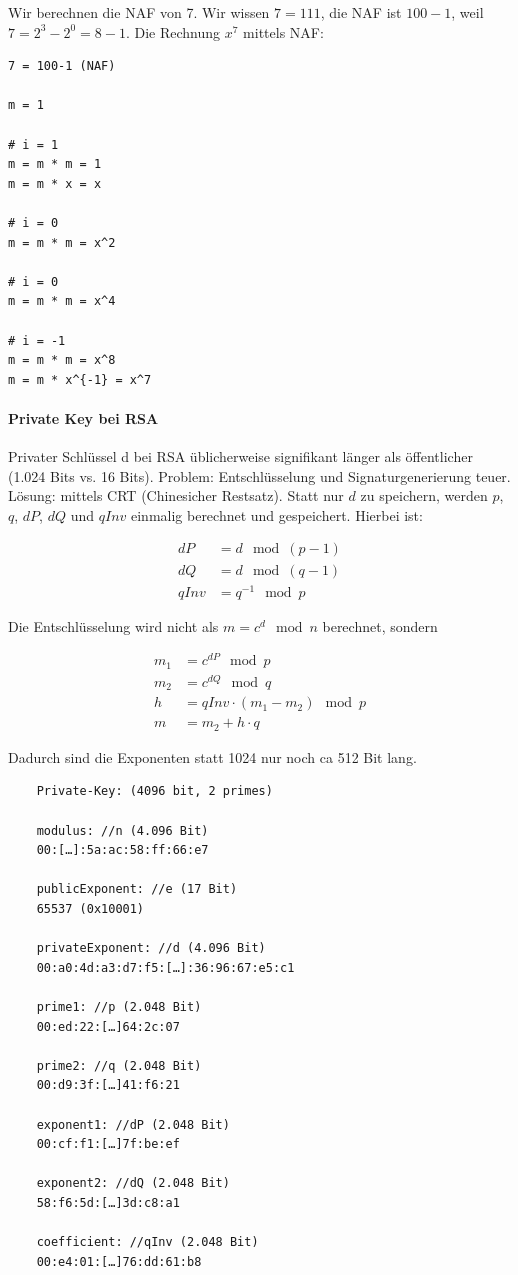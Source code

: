 Wir berechnen die NAF von 7. Wir wissen $7 = 111$, die NAF ist $100-1$, weil $7 = 2^3 - 2^0 = 8 - 1$. Die Rechnung $x^7$ mittels NAF:

\begin{verbatim}
7 = 100-1 (NAF)

m = 1

# i = 1
m = m * m = 1
m = m * x = x

# i = 0
m = m * m = x^2 

# i = 0
m = m * m = x^4

# i = -1
m = m * m = x^8
m = m * x^{-1} = x^7
\end{verbatim}

\paragraph{Private Key bei RSA}

Privater Schlüssel d bei RSA üblicherweise signifikant länger als öffentlicher (1.024 Bits vs. 16 Bits). Problem: Entschlüsselung und Signaturgenerierung teuer. \\

Lösung: mittels CRT (Chinesicher Restsatz). Statt nur $d$ zu speichern, werden $p$, $q$, $dP$, $dQ$ und $qInv$ einmalig berechnet und gespeichert. Hierbei ist:

\begin{align*}
dP &= d \mod (p-1) \\
dQ &= d \mod (q-1) \\
qInv &= q^{-1} \mod p
\end{align*}

Die Entschlüsselung wird nicht als $m = c^d \mod n$ berechnet, sondern 

\begin{align*}
    m_1 &= c^{dP} \mod p \\
    m_2 &= c^{dQ} \mod q \\
    h &= qInv \cdot (m_1 - m_2) \mod p \\
    m &= m_2 + h\cdot q
\end{align*}

Dadurch sind die Exponenten statt 1024 nur noch ca 512 Bit lang.

\begin{verbatim}
    Private-Key: (4096 bit, 2 primes)

    modulus: //n (4.096 Bit)
    00:[…]:5a:ac:58:ff:66:e7

    publicExponent: //e (17 Bit) 
    65537 (0x10001)
    
    privateExponent: //d (4.096 Bit)
    00:a0:4d:a3:d7:f5:[…]:36:96:67:e5:c1

    prime1: //p (2.048 Bit)
    00:ed:22:[…]64:2c:07

    prime2: //q (2.048 Bit)
    00:d9:3f:[…]41:f6:21

    exponent1: //dP (2.048 Bit)
    00:cf:f1:[…]7f:be:ef

    exponent2: //dQ (2.048 Bit)
    58:f6:5d:[…]3d:c8:a1

    coefficient: //qInv (2.048 Bit)
    00:e4:01:[…]76:dd:61:b8
\end{verbatim}